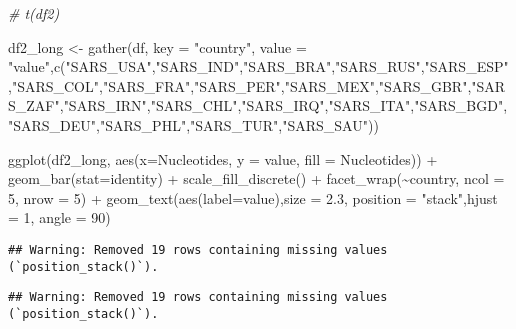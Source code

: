 \documentclass[
]{article}
\newenvironment{Shaded}{\begin{snugshade}}{\end{snugshade}}
\newcommand{\AttributeTok}[1]{\textcolor[rgb]{0.77,0.63,0.00}{#1}}
\newcommand{\CommentTok}[1]{\textcolor[rgb]{0.56,0.35,0.01}{\textit{#1}}}
\newcommand{\DecValTok}[1]{\textcolor[rgb]{0.00,0.00,0.81}{#1}}
\newcommand{\FloatTok}[1]{\textcolor[rgb]{0.00,0.00,0.81}{#1}}
\newcommand{\FunctionTok}[1]{\textcolor[rgb]{0.00,0.00,0.00}{#1}}
\newcommand{\NormalTok}[1]{#1}
\newcommand{\OtherTok}[1]{\textcolor[rgb]{0.56,0.35,0.01}{#1}}
\newcommand{\SpecialCharTok}[1]{\textcolor[rgb]{0.00,0.00,0.00}{#1}}
\newcommand{\StringTok}[1]{\textcolor[rgb]{0.31,0.60,0.02}{#1}}
\begin{document}
\begin{Shaded}
\begin{Highlighting}[]
\CommentTok{\# t(df2)}

\NormalTok{df2\_long }\OtherTok{\textless{}{-}} \FunctionTok{gather}\NormalTok{(df, }\AttributeTok{key =} \StringTok{"country"}\NormalTok{, }\AttributeTok{value =} \StringTok{"value"}\NormalTok{,}\FunctionTok{c}\NormalTok{(}\StringTok{"SARS\_USA"}\NormalTok{,}\StringTok{"SARS\_IND"}\NormalTok{,}\StringTok{"SARS\_BRA"}\NormalTok{,}\StringTok{"SARS\_RUS"}\NormalTok{,}\StringTok{"SARS\_ESP"}\NormalTok{,}\StringTok{"SARS\_COL"}\NormalTok{,}\StringTok{"SARS\_FRA"}\NormalTok{,}\StringTok{"SARS\_PER"}\NormalTok{,}\StringTok{"SARS\_MEX"}\NormalTok{,}\StringTok{"SARS\_GBR"}\NormalTok{,}\StringTok{"SARS\_ZAF"}\NormalTok{,}\StringTok{"SARS\_IRN"}\NormalTok{,}\StringTok{"SARS\_CHL"}\NormalTok{,}\StringTok{"SARS\_IRQ"}\NormalTok{,}\StringTok{"SARS\_ITA"}\NormalTok{,}\StringTok{"SARS\_BGD"}\NormalTok{,}\StringTok{"SARS\_DEU"}\NormalTok{,}\StringTok{"SARS\_PHL"}\NormalTok{,}\StringTok{"SARS\_TUR"}\NormalTok{,}\StringTok{"SARS\_SAU"}\NormalTok{))}


\FunctionTok{ggplot}\NormalTok{(df2\_long, }\FunctionTok{aes}\NormalTok{(}\AttributeTok{x=}\NormalTok{Nucleotides, }\AttributeTok{y =}\NormalTok{ value, }\AttributeTok{fill =}\NormalTok{ Nucleotides)) }\SpecialCharTok{+}
  \FunctionTok{geom\_bar}\NormalTok{(}\AttributeTok{stat=}\StringTok{\textquotesingle{}identity\textquotesingle{}}\NormalTok{) }\SpecialCharTok{+} \FunctionTok{scale\_fill\_discrete}\NormalTok{() }\SpecialCharTok{+}
  \FunctionTok{facet\_wrap}\NormalTok{(}\SpecialCharTok{\textasciitilde{}}\NormalTok{country, }\AttributeTok{ncol =} \DecValTok{5}\NormalTok{, }\AttributeTok{nrow =} \DecValTok{5}\NormalTok{)  }\SpecialCharTok{+}
  \FunctionTok{geom\_text}\NormalTok{(}\FunctionTok{aes}\NormalTok{(}\AttributeTok{label=}\NormalTok{value),}\AttributeTok{size =} \FloatTok{2.3}\NormalTok{, }\AttributeTok{position =} \StringTok{"stack"}\NormalTok{,}\AttributeTok{hjust =} \DecValTok{1}\NormalTok{, }\AttributeTok{angle =} \DecValTok{90}\NormalTok{)}
\end{Highlighting}
\end{Shaded}

\begin{verbatim}
## Warning: Removed 19 rows containing missing values (`position_stack()`).
\end{verbatim}

\begin{verbatim}
## Warning: Removed 19 rows containing missing values (`position_stack()`).
\end{verbatim}
\end{document}

